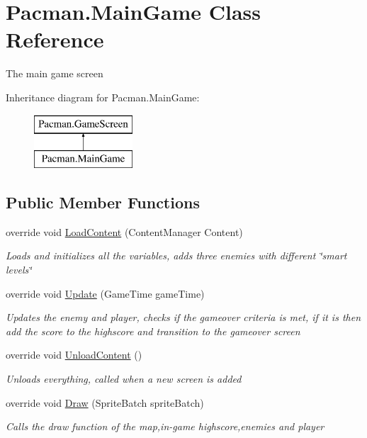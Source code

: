 \hypertarget{class_pacman_1_1_main_game}{\section{Pacman.\-Main\-Game Class Reference}
\label{class_pacman_1_1_main_game}
}


The main game screen  


Inheritance diagram for Pacman.\-Main\-Game\-:\begin{figure}[H]
\begin{center}
\leavevmode
\includegraphics[height=2.000000cm]{class_pacman_1_1_main_game}
\end{center}
\end{figure}
\subsection*{Public Member Functions}
\begin{DoxyCompactItemize}
\item 
override void \hyperlink{class_pacman_1_1_main_game_a8d51b2ec6cc93f142309ea6fe36b2b30}{Load\-Content} (Content\-Manager Content)
\begin{DoxyCompactList}\small\item\em Loads and initializes all the variables, adds three enemies with different \char`\"{}smart levels\char`\"{} \end{DoxyCompactList}\item 
override void \hyperlink{class_pacman_1_1_main_game_abb1d5e7608fa0d9752c0c434cb103e6b}{Update} (Game\-Time game\-Time)
\begin{DoxyCompactList}\small\item\em Updates the enemy and player, checks if the gameover criteria is met, if it is then add the score to the highscore and transition to the gameover screen \end{DoxyCompactList}\item 
override void \hyperlink{class_pacman_1_1_main_game_a7858b061a1db731df54381e03f71b7e0}{Unload\-Content} ()
\begin{DoxyCompactList}\small\item\em Unloads everything, called when a new screen is added \end{DoxyCompactList}\item 
override void \hyperlink{class_pacman_1_1_main_game_ae0723e8c7fcc6fe57383774b84bc5c91}{Draw} (Sprite\-Batch sprite\-Batch)
\begin{DoxyCompactList}\small\item\em Calls the draw function of the map,in-\/game highscore,enemies and player \end{DoxyCompactList}\end{DoxyCompactItemize}
